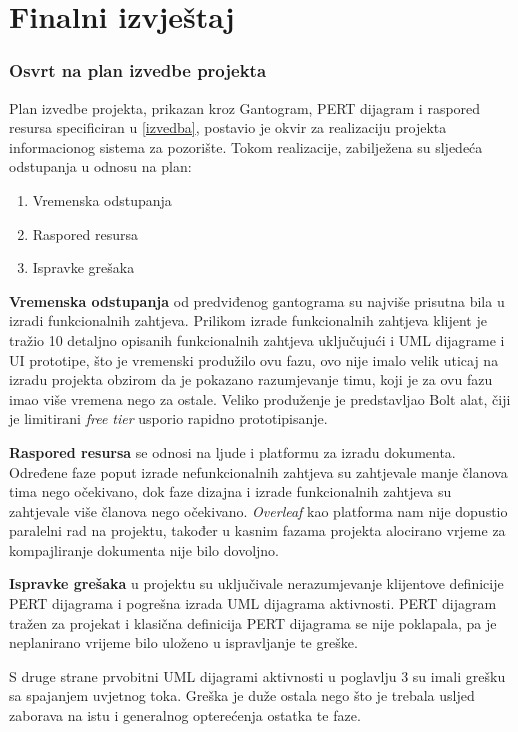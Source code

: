 \sloppy
\section{Finalni izvještaj}

\subsubsection{Osvrt na plan izvedbe projekta}

Plan izvedbe projekta, prikazan kroz Gantogram, PERT dijagram i raspored resursa specificiran u \ref{izvedba}, postavio je okvir za realizaciju projekta informacionog sistema za pozorište. Tokom realizacije, zabilježena su sljedeća odstupanja u odnosu na plan:
\begin{enumerate}
    \item Vremenska odstupanja
    \item Raspored resursa
    \item Ispravke grešaka
\end{enumerate}

\textbf{Vremenska odstupanja} od predviđenog gantograma su najviše prisutna bila u izradi funkcionalnih zahtjeva. Prilikom izrade funkcionalnih zahtjeva klijent je tražio 10 detaljno opisanih funkcionalnih zahtjeva uključujući i UML dijagrame i UI prototipe, što je vremenski produžilo ovu fazu, ovo nije imalo velik uticaj na izradu projekta obzirom da je pokazano razumjevanje timu, koji je za ovu fazu imao više vremena nego za ostale. Veliko produženje je predstavljao Bolt alat, čiji je limitirani \textit{ free tier} usporio rapidno prototipisanje.

\textbf{Raspored resursa} se odnosi na ljude i platformu za izradu dokumenta. Određene faze poput izrade nefunkcionalnih zahtjeva su zahtjevale manje članova tima nego očekivano, dok faze dizajna i izrade funkcionalnih zahtjeva su zahtjevale više članova nego očekivano.
\textit{Overleaf} kao platforma nam nije dopustio paralelni rad na projektu, također u kasnim fazama projekta alocirano vrjeme za kompajliranje dokumenta nije bilo dovoljno.

\textbf{Ispravke grešaka} u projektu su uključivale nerazumjevanje klijentove definicije PERT dijagrama i pogrešna izrada UML dijagrama aktivnosti. PERT dijagram tražen za projekat i klasična definicija PERT dijagrama se nije poklapala, pa je neplanirano vrijeme bilo uloženo u ispravljanje te greške.

S druge strane prvobitni UML dijagrami aktivnosti u poglavlju 3 su imali grešku sa spajanjem uvjetnog toka. Greška je duže ostala nego što je trebala usljed zaborava na istu i generalnog opterećenja ostatka te faze.

